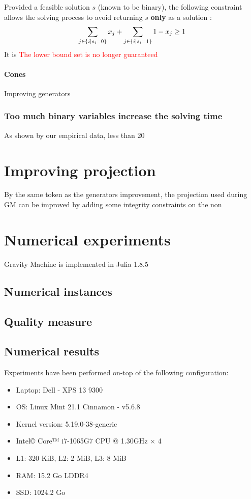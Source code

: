 %

Provided a feasible solution $s$ (known to be binary), the following constraint allows the solving process to avoid returning $s$ \textbf{only} as a solution \cite{canonical_cut}:
\[
\sum_{j \in \left\lbrace i \mid s_i = 0 \right\rbrace}x_j +  \sum_{j \in \left\lbrace i \mid s_i = 1 \right\rbrace}1-x_j \geq 1
\]
It is 
\textcolor{red}{The lower bound set is no longer guaranteed}
\paragraph{Cones}

\begin{algorithm}
\caption{Improving generators}\label{alg:Generators_improvement}
\end{algorithm}
\subsubsection{Too much binary variables increase the solving time}
As shown by our empirical data, less than 20

\section{Improving projection}
By the same token as the generators improvement, the projection used during GM can be improved by adding some integrity constraints on the non 

\section{Numerical experiments}
Gravity Machine is implemented in Julia 1.8.5 \cite{Julia-2017}
\subsection{Numerical instances}
\subsection{Quality measure}
\subsection{Numerical results}
Experiments have been performed on-top of the following configuration:
\begin{itemize}
    \item Laptop: Dell - XPS 13 9300
    \item OS: Linux Mint 21.1 Cinnamon - v5.6.8
    \item Kernel version: 5.19.0-38-generic
    \item Intel© Core™ i7-1065G7 CPU @ 1.30GHz × 4
    \item L1: 320 KiB, L2: 2 MiB, L3: 8 MiB
    \item RAM: 15.2 Go LDDR4
    \item SSD: 1024.2 Go
\end{itemize}
\subsubsection{}